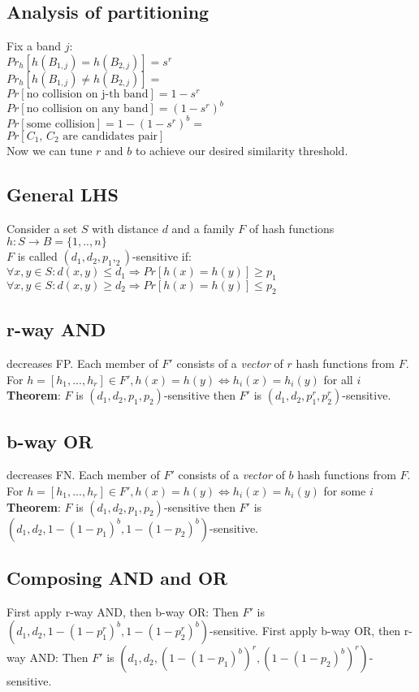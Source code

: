 \subsection*{Analysis of partitioning}
Fix a band $j$:\\
$Pr_h[h(B_{1,j}) = h(B_{2,j})] = s^r$\\
$Pr_h[h(B_{1,j}) \not = h(B_{2,j})] =$\\
$Pr[\text{no collision on j-th band}] =1-s^r$\\
$Pr[\text{no collision on any band}] = (1-s^r)^b$\\
$Pr[\text{some collision}]= 1-(1-s^r)^b =$\\
$Pr[\text{$C_1$, $C_2$ are candidates pair}]$\\
Now we can tune $r$ and $b$ to achieve our desired similarity threshold.

\subsection*{General LHS}
Consider a set $S$ with distance $d$ and a family $F$ of hash functions $h: S \rightarrow B = \{1,..,n\}$\\
$F$ is called $(d_1,d_2,p_1,_2)$-sensitive if:\\
$\forall x,y \in S : d(x,y) \leq d_1 \Rightarrow Pr[h(x)=h(y)] \geq p_1$\\
$\forall x,y \in S : d(x,y) \geq d_2 \Rightarrow Pr[h(x) = h(y)] \leq p_2$

\subsection*{r-way AND}
decreases FP. Each member of $F'$ consists of a \emph{vector} of $r$ hash functions from $F$.\\
For $h=[h_1,...,h_r] \in F', h(x)=h(y) \Leftrightarrow h_i(x) = h_i(y)$ for all $i$\\
\textbf{Theorem}: $F$ is $(d_1,d_2,p_1,p_2)$-sensitive then $F'$ is $(d_1,d_2, p_1^r, p_2^r)$-sensitive.

\subsection*{b-way OR}
decreases FN. Each member of $F'$ consists of a \emph{vector} of $b$ hash functions from $F$.\\
For $h=[h_1,...,h_r] \in F', h(x)=h(y) \Leftrightarrow h_i(x) = h_i(y)$ for some $i$\\
\textbf{Theorem}: $F$ is $(d_1,d_2,p_1,p_2)$-sensitive then $F'$ is $(d_1,d_2, 1-(1-p_1)^b, 1-(1-p_2)^b)$-sensitive.

\subsection*{Composing AND and OR}
First apply r-way AND, then b-way OR: Then $F'$ is $(d_1,d_2, 1-(1-p_1^r)^b, 1-(1-p_2^r)^b)$-sensitive.
First apply b-way OR, then r-way AND: Then $F'$ is $(d_1,d_2, (1-(1-p_1)^b)^r, (1-(1-p_2)^b)^r)$-sensitive.